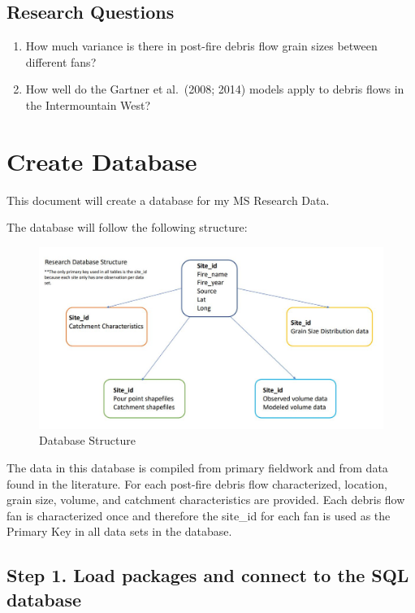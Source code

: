 \documentclass[
]{book}
\begin{document}
\hypertarget{research-questions}{%
\section{Research Questions}\label{research-questions}}

\begin{enumerate}
\def\labelenumi{\arabic{enumi}.}
\item
  How much variance is there in post-fire debris flow grain sizes between different fans?
\item
  How well do the Gartner et al.~(2008; 2014) models apply to debris flows in the Intermountain West?
\end{enumerate}

\hypertarget{database}{%
\chapter{Create Database}\label{database}}

This document will create a database for my MS Research Data.

The database will follow the following structure:

\begin{figure}

{\centering \includegraphics[width=0.8\linewidth]{database_structure} 

}

\caption{Database Structure}\label{fig:image}
\end{figure}

The data in this database is compiled from primary fieldwork and from data found in the literature. For each post-fire debris flow characterized, location, grain size, volume, and catchment characteristics are provided. Each debris flow fan is characterized once and therefore the site\_id for each fan is used as the Primary Key in all data sets in the database.

\hypertarget{step-1.-load-packages-and-connect-to-the-sql-database}{%
\section{Step 1. Load packages and connect to the SQL database}\label{step-1.-load-packages-and-connect-to-the-sql-database}}
\end{document}
